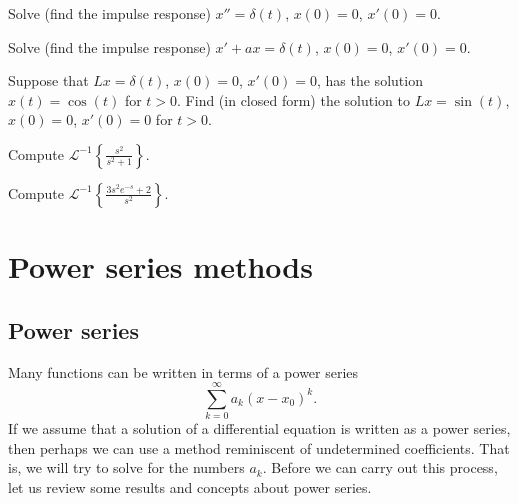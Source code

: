 \documentclass[12pt]{book}
\begin{document}
\begin{exercise}
Solve (find the impulse response)
$x'' = \delta(t)$, $x(0) = 0$, $x'(0)=0$.
\end{exercise}

\begin{exercise}
Solve (find the impulse response)
$x' + a x = \delta(t)$, $x(0) = 0$, $x'(0)=0$.
\end{exercise}

\begin{exercise}
Suppose that $L x = \delta(t)$, $x(0) = 0$, $x'(0) = 0$, has the solution
$x(t) = \cos(t)$ for $t > 0$.  Find (in closed form) the solution to
$Lx = \sin(t)$, $x(0) = 0$, $x'(0) = 0$ for $t > 0$.
\end{exercise}

\begin{exercise}
Compute
${\mathcal{L}}^{-1} \left\{ \frac{s^2}{s^2+1} \right\}$.
\end{exercise}

\begin{exercise}
Compute
${\mathcal{L}}^{-1} \left\{ \frac{3 s^2 e^{-s} + 2}{s^2} \right\}$.
\end{exercise}




\chapter{Power series methods} \label{ps:chapter}


\section{Power series}


Many functions can be written in terms of a power series
\begin{equation*}
\sum_{k=0}^\infty a_k {(x-x_0)}^k .
\end{equation*}
If we assume that a solution of a differential equation is written as a
power series, then perhaps we can use a method reminiscent of undetermined
coefficients.  That is, we will try to solve for the numbers $a_k$.
Before we can carry out this process, let us review some results
and concepts about power series.
\end{document}
